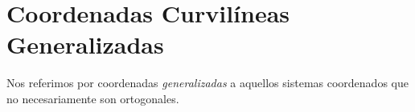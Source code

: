 \chapter{Coordenadas Curvilíneas Generalizadas}

Nos referimos por coordenadas \emph{generalizadas} a aquellos sistemas coordenados que no necesariamente son ortogonales.